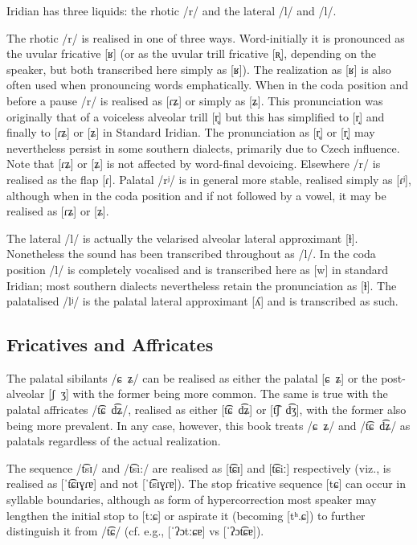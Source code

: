 Iridian has three liquids: the rhotic /r/ and the lateral /l/ and /l/.

The rhotic /r/ is realised in one of three ways. Word-initially it is pronounced as the uvular fricative [ʁ] (or as the uvular trill fricative [ʀ̝], depending on the speaker, but both transcribed here simply as [ʁ]). The realization as [ʁ] is also often used when pronouncing words emphatically. When in the coda position and before a pause /r/ is realised as [ɾʑ] or simply as [ʑ]. This pronunciation was originally that of a voiceless alveolar trill [r̥] but this has simplified to [r̝] and finally to [ɾʑ] or [ʑ] in Standard Iridian. The  pronunciation as [r̥] or [r̝] may nevertheless persist in some southern dialects, primarily due to Czech influence. Note that [ɾʑ] or [ʑ] is not affected by word-final devoicing. Elsewhere /r/ is realised as the flap [ɾ]. Palatal /rʲ/ is in general more stable, realised simply as [ɾʲ], although when in the coda position and if not followed by a vowel, it may be realised as [ɾʑ] or [ʑ].

The lateral /l/ is actually the velarised alveolar lateral approximant [ɫ]. Nonetheless the sound has been transcribed throughout as /l/. In the coda position /l/ is completely vocalised and is transcribed here as [w] in standard Iridian; most southern dialects nevertheless retain the pronunciation as [ɫ]. The palatalised /lʲ/ is the palatal lateral approximant [ʎ] and is transcribed as such.

\subsection{Fricatives and Affricates}

The palatal sibilants /ɕ~ʑ/ can be realised as either the palatal [ɕ~ʑ] or
the post-alveolar [ʃ~ʒ] with the former being more common. The same is true
with the palatal affricates /t͡ɕ~d͡ʑ/, realised as either [t͡ɕ~d͡ʑ] or [t͡ʃ~d͡ʒ],
with the former also being more prevalent. In any case, however, this book treats /ɕ~ʑ/ and /t͡ɕ~d͡ʑ/ as palatals regardless of the actual realization.

The sequence /t͡sɪ/ and /t͡si:/ are realised as [t͡ɕɪ] and [t͡ɕiː] respectively
(viz.,  is realised as [ˈt͡ɕɪɣɾɐ] and not [ˈt͡sɪɣɾɐ]).
The stop fricative sequence [tɕ] can occur in syllable boundaries,
although as form of hypercorrection most speaker may lengthen the initial
stop to [tːɕ] or aspirate it (becoming [tʰ.ɕ]) to further distinguish it
from /t͡ɕ/ (cf. e.g.,  [ˈʔɔtːɕɐ] vs 
[ˈʔɔt͡ɕɐ]).

